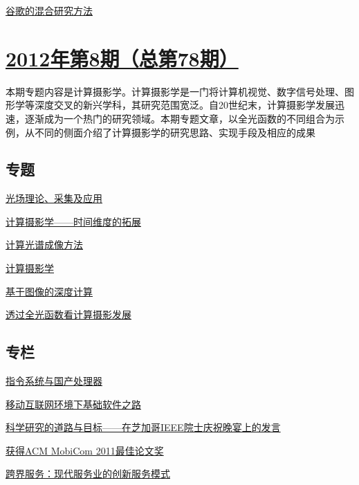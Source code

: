 \documentclass[a4paper]{article}
\begin{document}
\href{http://history.ccf.org.cn/resources/1190201776262/2012/09/13/16.pdf}{谷歌的混合研究方法}


\section{\href{http://history.ccf.org.cn/sites/ccf/jsjtbbd.jsp?contentId=2689951732598}{\textbf{2012年第8期（总第78期）}}}
本期专题内容是计算摄影学。计算摄影学是一门将计算机视觉、数字信号处理、图形学等深度交叉的新兴学科，其研究范围宽泛。自20世纪末，计算摄影学发展迅速，逐渐成为一个热门的研究领域。本期专题文章，以全光函数的不同组合为示例，从不同的侧面介绍了计算摄影学的研究思路、实现手段及相应的成果
\subsection{专题}
\href{http://history.ccf.org.cn/resources/1190201776262/2012/08/15/3.pdf}{光场理论、采集及应用}

\href{http://history.ccf.org.cn/resources/1190201776262/2012/08/15/4.pdf}{计算摄影学——时间维度的拓展}

\href{http://history.ccf.org.cn/resources/1190201776262/2012/08/15/5.pdf}{计算光谱成像方法}

\href{http://history.ccf.org.cn/resources/1190201776262/2012/08/15/1.pdf}{计算摄影学}

\href{http://history.ccf.org.cn/resources/1190201776262/2012/08/15/6.pdf}{基于图像的深度计算}

\href{http://history.ccf.org.cn/resources/1190201776262/2012/08/15/2.pdf}{透过全光函数看计算摄影发展}

\subsection{专栏}
\href{http://history.ccf.org.cn/resources/1190201776262/2012/08/15/10.pdf}{指令系统与国产处理器}

\href{http://history.ccf.org.cn/resources/1190201776262/2012/08/15/11.pdf}{移动互联网环境下基础软件之路}

\href{http://history.ccf.org.cn/resources/1190201776262/2012/08/15/7.pdf}{科学研究的道路与目标——在芝加哥IEEE院士庆祝晚宴上的发言}

\href{http://history.ccf.org.cn/resources/1190201776262/2012/08/15/8.pdf}{获得ACM MobiCom 2011最佳论文奖}

\href{http://history.ccf.org.cn/resources/1190201776262/2012/08/15/9.pdf}{跨界服务：现代服务业的创新服务模式}
\end{document}
